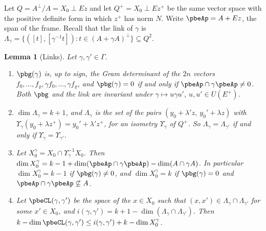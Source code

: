 \documentclass[10pt]{amsart}
\newtheorem{lemma}[theorem]{Lemma}
\theoremstyle{definition}
\theoremstyle{remark}
\begin{document}
Let $Q=A^\perp/A=X_0\perp Ez$ and let $Q^+=X_0\perp Ez^+$ be the same vector space with the positive
definite form in which $z^+$ has norm $N$. Write $\pbeAp=A+Ez$, the span of the frame. Recall that
the link of $\gamma$ is $\Lambda_\gamma=\{([t],[\gamma^{-1}t]):t\in(A+\gamma A)^\perp\}\subseteq Q^2$.

\begin{lemma}[Links]\label{pbe:link}
Let $\gamma,\gamma'\in\Gamma$.
\begin{enumerate}
\item[(a)] $\pbg(\gamma)$ is, up to sign, the Gram determinant of the $2n$ vectors $f_0,\dots,
f_\varrho,\gamma f_0,\dots,\gamma f_\varrho$, and $\pbg(\gamma)=0$ if and only if $\pbeAp\cap\gamma
\pbeAp\ne0$. Both $\pbg$ and the link are invariant under $\gamma\mapsto u\gamma u'$, $u,u'\in
U(E^+)$.
\item[(b)] $\dim\Lambda_\gamma=k+1$, and $\Lambda_\gamma$ is the set of the pairs $(y_0+\lambda'z,\
y_0'+\lambda z)$ with $\Upsilon_\gamma(y_0+\lambda z^+)=y_0'+\lambda'z^+$, for an isometry
$\Upsilon_\gamma$ of $Q^+$. So $\Lambda_\gamma=\Lambda_{\gamma'}$ if and only if $\Upsilon_\gamma=
\Upsilon_{\gamma'}$.
\item[(c)] Let $X_0^\gamma=X_0\cap\Upsilon_\gamma^{-1}X_0$. Then $\dim X_0^\gamma=k-1+\dim(\pbeAp\cap
\gamma\pbeAp)-\dim(A\cap\gamma A)$. In particular $\dim X_0^\gamma=k-1$ if $\pbg(\gamma)\ne0$, and
$\dim X_0^\gamma=k$ if $\pbg(\gamma)=0$ and $\pbeAp\cap\gamma\pbeAp\not\subseteq A$.
\item[(d)] Let $\pbeCL(\gamma,\gamma')$ be the space of the $x\in X_0$ such that $(x,x')\in\Lambda_
\gamma\cap\Lambda_{\gamma'}$ for some $x'\in X_0$, and $i(\gamma,\gamma')=k+1-\dim(\Lambda_\gamma\cap
\Lambda_{\gamma'})$. Then $k-\dim\pbeCL(\gamma,\gamma')\le i(\gamma,\gamma')+k-\dim X_0^\gamma$.
\end{enumerate}
\end{lemma}
\end{document}
